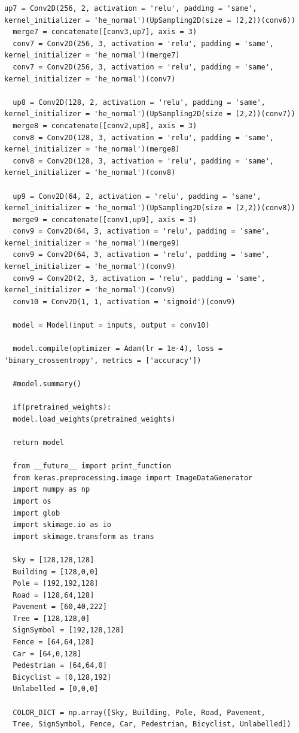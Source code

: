 \documentclass[times]{itmo-student-thesis}
\begin{document}
\begin{lstlisting}[caption={Реализация сети Unet},label={lstX}]
  up7 = Conv2D(256, 2, activation = 'relu', padding = 'same', kernel_initializer = 'he_normal')(UpSampling2D(size = (2,2))(conv6))
  merge7 = concatenate([conv3,up7], axis = 3)
  conv7 = Conv2D(256, 3, activation = 'relu', padding = 'same', kernel_initializer = 'he_normal')(merge7)
  conv7 = Conv2D(256, 3, activation = 'relu', padding = 'same', kernel_initializer = 'he_normal')(conv7)
  
  up8 = Conv2D(128, 2, activation = 'relu', padding = 'same', kernel_initializer = 'he_normal')(UpSampling2D(size = (2,2))(conv7))
  merge8 = concatenate([conv2,up8], axis = 3)
  conv8 = Conv2D(128, 3, activation = 'relu', padding = 'same', kernel_initializer = 'he_normal')(merge8)
  conv8 = Conv2D(128, 3, activation = 'relu', padding = 'same', kernel_initializer = 'he_normal')(conv8)
  
  up9 = Conv2D(64, 2, activation = 'relu', padding = 'same', kernel_initializer = 'he_normal')(UpSampling2D(size = (2,2))(conv8))
  merge9 = concatenate([conv1,up9], axis = 3)
  conv9 = Conv2D(64, 3, activation = 'relu', padding = 'same', kernel_initializer = 'he_normal')(merge9)
  conv9 = Conv2D(64, 3, activation = 'relu', padding = 'same', kernel_initializer = 'he_normal')(conv9)
  conv9 = Conv2D(2, 3, activation = 'relu', padding = 'same', kernel_initializer = 'he_normal')(conv9)
  conv10 = Conv2D(1, 1, activation = 'sigmoid')(conv9)
  
  model = Model(input = inputs, output = conv10)
  
  model.compile(optimizer = Adam(lr = 1e-4), loss = 'binary_crossentropy', metrics = ['accuracy'])
  
  #model.summary()
  
  if(pretrained_weights):
  model.load_weights(pretrained_weights)
  
  return model
  
  from __future__ import print_function
  from keras.preprocessing.image import ImageDataGenerator
  import numpy as np 
  import os
  import glob
  import skimage.io as io
  import skimage.transform as trans
  
  Sky = [128,128,128]
  Building = [128,0,0]
  Pole = [192,192,128]
  Road = [128,64,128]
  Pavement = [60,40,222]
  Tree = [128,128,0]
  SignSymbol = [192,128,128]
  Fence = [64,64,128]
  Car = [64,0,128]
  Pedestrian = [64,64,0]
  Bicyclist = [0,128,192]
  Unlabelled = [0,0,0]
  
  COLOR_DICT = np.array([Sky, Building, Pole, Road, Pavement,
  Tree, SignSymbol, Fence, Car, Pedestrian, Bicyclist, Unlabelled])
  

\end{lstlisting}
\end{document}
